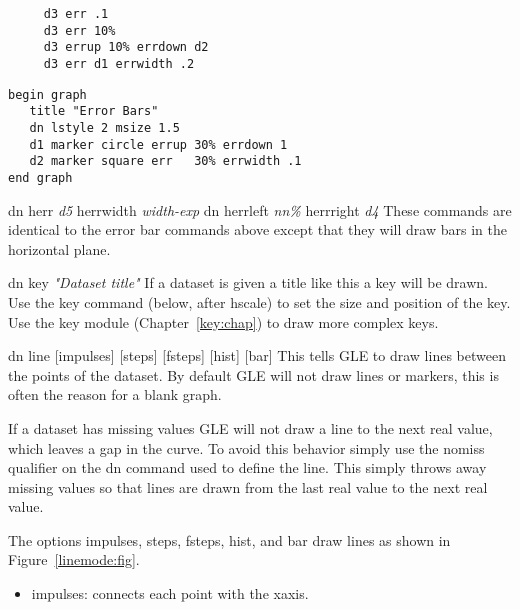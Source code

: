 \begin{commanddescription}
\preglecode{}
\begin{Verbatim}
     d3 err .1
     d3 err 10%
     d3 errup 10% errdown d2
     d3 err d1 errwidth .2
\end{Verbatim}
\postglecode{}

\begin{minipage}[c]{8cm}
\begin{Verbatim}
begin graph
   title "Error Bars"
   dn lstyle 2 msize 1.5
   d1 marker circle errup 30% errdown 1
   d2 marker square err   30% errwidth .1
end graph
\end{Verbatim}
\end{minipage}
\hfill
\begin{minipage}[c]{7cm}
\mbox{}
\end{minipage}

\item[{\sf dn herr {\it d5} herrwidth {\it width-exp} dn herrleft {\it nn\%} herrright {\it d4}} ]
   
These commands are identical to the error bar commands above except that
they will draw bars in the horizontal plane.

\item[{\sf dn key {\it "Dataset title"}}  ]
If a dataset is given a title like this a key will be drawn.  Use the
{\sf key} command (below, after hscale) to set the size and
position of the key.  Use the key module (Chapter~\ref{key:chap}) to draw
more complex keys.

\item[{\sf dn line [impulses] [steps] [fsteps] [hist] [bar]}]
This tells GLE to draw lines between the points of the dataset.  By
default GLE will not draw lines or markers, this is often the reason
for a blank graph.

If a dataset has missing values GLE will not draw a line to the next
real value, which leaves a gap in the curve.  To avoid this
behavior simply use the {\sf nomiss} qualifier on the {\sf dn} command
used to define the line. This simply throws away missing values so that
lines are drawn from the last real value to the next real value.

The options {\sf impulses}, {\sf steps}, {\sf fsteps}, {\sf hist}, and {\sf bar} draw lines as shown in Figure~\ref{linemode:fig}.
\begin{itemize}
\item {\sf impulses}: connects each point with the xaxis.


\end{itemize}
\end{commanddescription}
